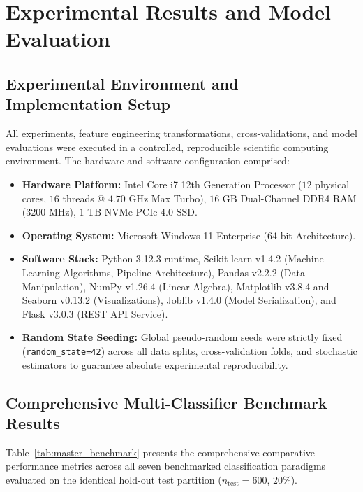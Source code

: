 \documentclass[12pt,a4paper,oneside]{report}
\begin{document}
\chapter{Experimental Results and Model Evaluation}
\label{ch:results}

\section{Experimental Environment and Implementation Setup}
\label{sec:experimental_setup}
All experiments, feature engineering transformations, cross-validations, and model evaluations were executed in a controlled, reproducible scientific computing environment. The hardware and software configuration comprised:
\begin{itemize}
    \item \textbf{Hardware Platform:} Intel Core i7 12th Generation Processor ($12$ physical cores, $16$ threads @ $4.70\text{ GHz}$ Max Turbo), $16\text{ GB}$ Dual-Channel DDR4 RAM ($3200\text{ MHz}$), $1\text{ TB}$ NVMe PCIe 4.0 SSD.
    \item \textbf{Operating System:} Microsoft Windows 11 Enterprise (64-bit Architecture).
    \item \textbf{Software Stack:} Python 3.12.3 runtime, Scikit-learn v1.4.2 (Machine Learning Algorithms, Pipeline Architecture), Pandas v2.2.2 (Data Manipulation), NumPy v1.26.4 (Linear Algebra), Matplotlib v3.8.4 and Seaborn v0.13.2 (Visualizations), Joblib v1.4.0 (Model Serialization), and Flask v3.0.3 (REST API Service).
    \item \textbf{Random State Seeding:} Global pseudo-random seeds were strictly fixed (\texttt{random\_state=42}) across all data splits, cross-validation folds, and stochastic estimators to guarantee absolute experimental reproducibility.
\end{itemize}

\section{Comprehensive Multi-Classifier Benchmark Results}
\label{sec:classifier_benchmarks}
Table~\ref{tab:master_benchmark} presents the comprehensive comparative performance metrics across all seven benchmarked classification paradigms evaluated on the identical hold-out test partition ($n_{\text{test}} = 600$, $20\%$).
\end{document}
